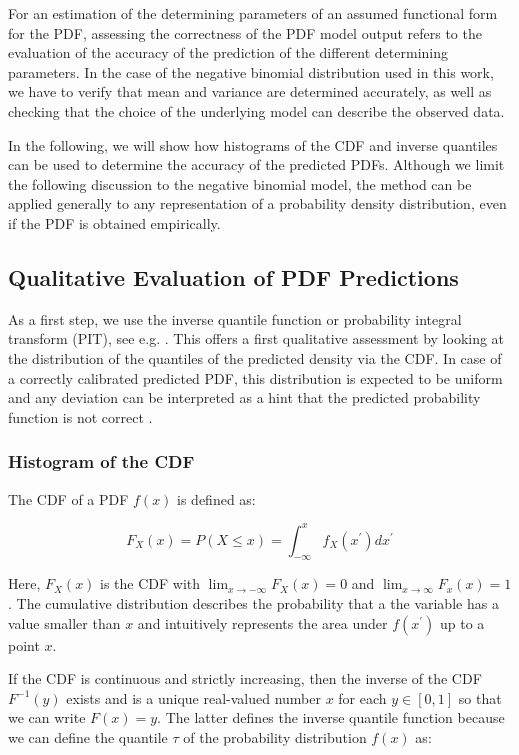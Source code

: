 \documentclass[BCOR=1mm, DIV=calc,10pt,
twoside=true,
twocolumn,
headings=normal]{scrartcl}
\begin{document}
For an estimation of the determining parameters of an assumed functional form for the PDF, assessing the correctness of the PDF model output refers to the evaluation of the accuracy of the prediction of the different determining parameters. In the case of the negative binomial distribution used in this work, we have to verify that mean and variance are determined accurately, as well as checking that the choice of the underlying model can describe the observed data.

In the following, we will show how histograms of the CDF and inverse quantiles can be used to determine the accuracy of the predicted PDFs. Although we limit the following discussion to the negative binomial model, the method can be applied generally to any representation of a probability density distribution, even if the PDF is obtained empirically.


\subsection{Qualitative Evaluation of PDF Predictions}

As a first step, we use the inverse quantile function or probability integral transform (PIT), see e.g. \cite{Angus1994,casella2002statistical}. This offers a first qualitative assessment by looking at the distribution of the quantiles of the predicted density via the CDF. In case of a correctly calibrated predicted PDF, this distribution is expected to be uniform and any deviation can be interpreted as a hint that the predicted probability function is not correct \cite{diebold1998vevaluating}.

\subsubsection{Histogram of the CDF}
\label{sec:cdf_histo}

The CDF of a PDF $f(x)$ is defined as:

\begin{equation}
\label{eqn:CDF}
F_X(x) = P(X \le x) = \int_{-\infty}^{x} f_X(x^\prime) dx^\prime
\end{equation}

Here, $F_X(x)$ is the CDF with $\lim_{x \to -\infty}F_X(x) = 0$ and $\lim_{x \to \infty}F_x(x) = 1$. The cumulative distribution describes the probability that a the variable has a value smaller than $x$ and intuitively represents the area under $f(x^\prime)$ up to a point $x$.

If the CDF is continuous and strictly increasing, then the inverse of the CDF $F^{-1}(y)$ exists and is a unique real-valued number $x$ for each $y \in [0,1]$ so that we can write $F(x) = y$. The latter defines the inverse quantile function because we can define the quantile $\tau$ of the probability distribution $f(x)$ as:
\end{document}
